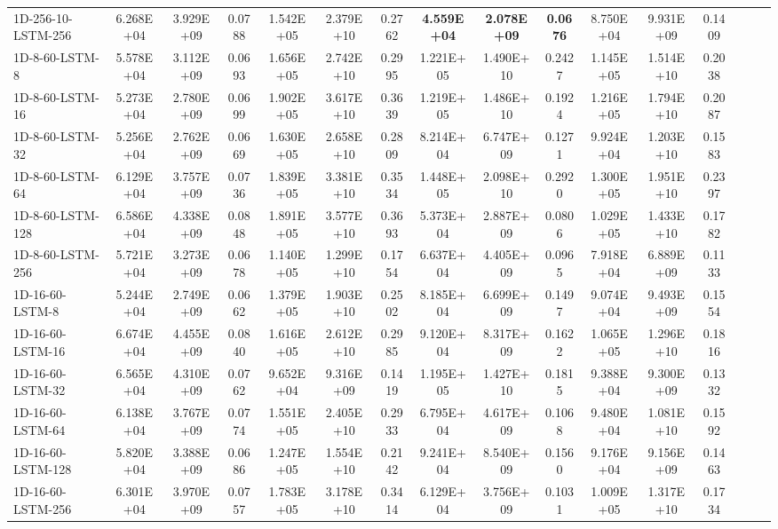 \begin{landscape}
\begin{longtable}{|l|c|c|c|c|c|c|c|c|c|c|c|c|c|c|c|}
    1D-256-10-LSTM-256 & 6.268E+04 & 3.929E+09 & 0.0788 & 1.542E+05 & 2.379E+10 & 0.2762 & \cellcolor[rgb]{ .573,  .816,  .314}\textbf{4.559E+04} & \cellcolor[rgb]{ .573,  .816,  .314}\textbf{2.078E+09} & \cellcolor[rgb]{ .573,  .816,  .314}\textbf{0.0676} & 8.750E+04 & 9.931E+09 & 0.1409 \\
    1D-8-60-LSTM-8 & 5.578E+04 & 3.112E+09 & 0.0693 & 1.656E+05 & 2.742E+10 & 0.2995 & 1.221E+05 & 1.490E+10 & 0.2427 & 1.145E+05 & 1.514E+10 & 0.2038 \\
    1D-8-60-LSTM-16 & 5.273E+04 & 2.780E+09 & 0.0699 & 1.902E+05 & 3.617E+10 & 0.3639 & 1.219E+05 & 1.486E+10 & 0.1924 & 1.216E+05 & 1.794E+10 & 0.2087 \\
    1D-8-60-LSTM-32 & 5.256E+04 & 2.762E+09 & 0.0669 & 1.630E+05 & 2.658E+10 & 0.2809 & 8.214E+04 & 6.747E+09 & 0.1271 & 9.924E+04 & 1.203E+10 & 0.1583 \\
    1D-8-60-LSTM-64 & 6.129E+04 & 3.757E+09 & 0.0736 & 1.839E+05 & 3.381E+10 & 0.3534 & 1.448E+05 & 2.098E+10 & 0.2920 & 1.300E+05 & 1.951E+10 & 0.2397 \\
    1D-8-60-LSTM-128 & 6.586E+04 & 4.338E+09 & 0.0848 & 1.891E+05 & 3.577E+10 & 0.3693 & 5.373E+04 & 2.887E+09 & 0.0806 & 1.029E+05 & 1.433E+10 & 0.1782 \\
    1D-8-60-LSTM-256 & 5.721E+04 & 3.273E+09 & 0.0678 & 1.140E+05 & 1.299E+10 & 0.1754 & 6.637E+04 & 4.405E+09 & 0.0965 & 7.918E+04 & 6.889E+09 & 0.1133 \\
    1D-16-60-LSTM-8 & 5.244E+04 & 2.749E+09 & 0.0662 & 1.379E+05 & 1.903E+10 & 0.2502 & 8.185E+04 & 6.699E+09 & 0.1497 & 9.074E+04 & 9.493E+09 & 0.1554 \\
    1D-16-60-LSTM-16 & 6.674E+04 & 4.455E+09 & 0.0840 & 1.616E+05 & 2.612E+10 & 0.2985 & 9.120E+04 & 8.317E+09 & 0.1622 & 1.065E+05 & 1.296E+10 & 0.1816 \\
    1D-16-60-LSTM-32 & 6.565E+04 & 4.310E+09 & 0.0762 & 9.652E+04 & 9.316E+09 & 0.1419 & 1.195E+05 & 1.427E+10 & 0.1815 & 9.388E+04 & 9.300E+09 & 0.1332 \\
    1D-16-60-LSTM-64 & 6.138E+04 & 3.767E+09 & 0.0774 & 1.551E+05 & 2.405E+10 & 0.2933 & 6.795E+04 & 4.617E+09 & 0.1068 & 9.480E+04 & 1.081E+10 & 0.1592 \\
    1D-16-60-LSTM-128 & 5.820E+04 & 3.388E+09 & 0.0686 & 1.247E+05 & 1.554E+10 & 0.2142 & 9.241E+04 & 8.540E+09 & 0.1560 & 9.176E+04 & 9.156E+09 & 0.1463 \\
    1D-16-60-LSTM-256 & 6.301E+04 & 3.970E+09 & 0.0757 & 1.783E+05 & 3.178E+10 & 0.3414 & 6.129E+04 & 3.756E+09 & 0.1031 & 1.009E+05 & 1.317E+10 & 0.1734 \\

\end{longtable}
\end{landscape}

